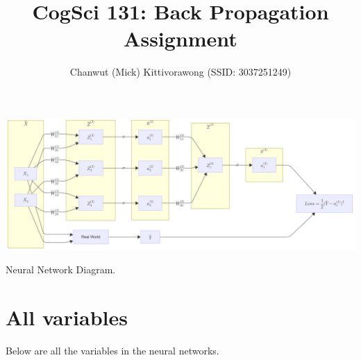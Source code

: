 \documentclass[sigconf, nonacm]{acmart}
\begin{document}
\title{CogSci 131: Back Propagation Assignment}

\author{Chanwut (Mick) Kittivorawong (SSID: 3037251249)}

\begin{teaserfigure}
    \centering
    \includegraphics[width=\textwidth]{nn.png}
  \caption{Neural Network Diagram.}
\end{teaserfigure}

\maketitle

\section{All variables}
Below are all the variables in the neural networks.

\newcommand{\X}{$\hat{X} = \begin{bmatrix}
X_1 &
X_2
\end{bmatrix}$}
\newcommand{\WOne}{
$\hat{W}^{(1)} = \begin{bmatrix}
W^{(1)}_{11} & W^{(1)}_{12} & W^{(1)}_{13}\\
W^{(1)}_{21} & W^{(1)}_{22} & W^{(1)}_{23}
\end{bmatrix}$
}
\newcommand{\ZOne}{
$\hat{Z}^{(2)} = \begin{bmatrix}
Z^{(2)}_1 &
Z^{(2)}_2 &
Z^{(2)}_3
\end{bmatrix}$
}
\newcommand{\aOne}{
$\hat{a}^{(2)} = \begin{bmatrix}
a^{(2)}_1 &
a^{(2)}_2 &
a^{(2)}_3
\end{bmatrix}$
}
\newcommand{\WTwo}{
$\hat{W}^{(2)} = \begin{bmatrix}
W^{(2)}_{11} &
W^{(2)}_{21} &
W^{(2)}_{31}
\end{bmatrix}^\top$
}
\newcommand{\ZTwo}{
$\hat{Z}^{(3)} = \begin{bmatrix}
Z^{(3)}_1
\end{bmatrix}$
}
\newcommand{\aTwo}{
$\hat{a}^{(3)} = \begin{bmatrix}
a^{(3)}_1
\end{bmatrix}$
}
\newcommand{\Loss}{
$L = \tfrac{1}{2} (\hat{Y} - a^{(3)}_1)^2$
}
\end{document}
